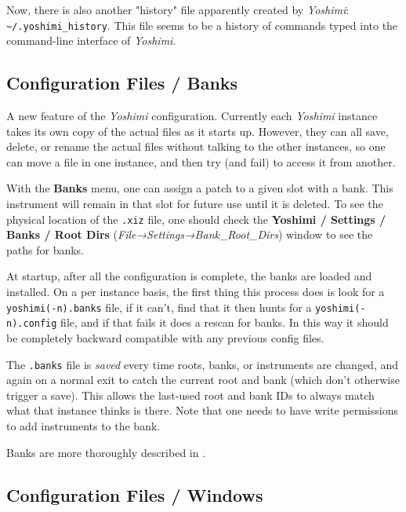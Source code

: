    Now, there is also another "history" file apparently created by
   \textsl{Yoshimi}: \texttt{\textasciitilde/.yoshimi\_history}.
   This file seems to be a history of commands typed into the command-line
   interface of \textsl{Yoshimi}.

\subsection{Configuration Files / Banks}
\label{subsec:configuration_banks}

   A new feature of the \textsl{Yoshimi} configuration.  Currently each
   \textsl{Yoshimi} instance takes its own copy of the actual files as it starts
   up.  However, they can all save, delete, or rename the actual files without
   talking to the other instances, so one can move a file in one instance, and
   then try (and fail) to access it from another.

   With the \textbf{Banks} menu, one can assign a patch to a given slot with
   a bank.  This instrument will remain in that slot for future use until it is
   deleted. To see the physical location of the \texttt{.xiz} file, one
   should check the
   \textbf{Yoshimi / Settings / Banks / Root Dirs}
   (\textsl{File→Settings→Bank\_Root\_Dirs}) window to see the paths for
   banks.

   At startup, after all the configuration is complete, the banks are loaded and
   installed.  On a per instance basis, the first thing this process does is
   look for a \texttt{yoshimi(-n).banks} file, if it can't, find that it then
   hunts for a \texttt{yoshimi(-n).config} file, and if that fails it does a
   rescan for banks. In this way it should be completely backward compatible
   with any previous config files.

   The \texttt{.banks} file is \textsl{saved} every time roots, banks, or
   instruments are changed, and again on a normal exit to catch the current
   root and bank (which don't otherwise trigger a save).  This allows the
   last-used root and bank IDs to always match what that instance thinks is
   there.
   Note that one needs to have write permissions to add instruments to the
   bank.
   
   Banks are more thoroughly described in
   .

\subsection{Configuration Files / Windows}
\label{subsec:configuration_windows}

